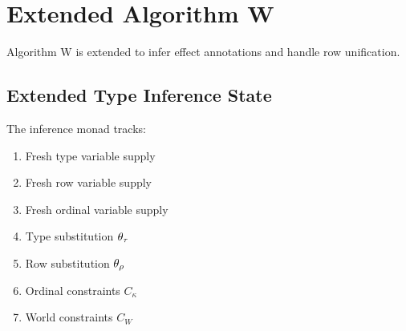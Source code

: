 \section{Extended Algorithm W}
\label{sec:extended-algorithm-w}

Algorithm W is extended to infer effect annotations and handle row unification.

\subsection{Extended Type Inference State}
\label{subsec:extended-infer-state}

\begin{definition}
\label{def:extended-infer-monad}
The inference monad tracks:
\begin{enumerate}
  \item Fresh type variable supply
  \item Fresh row variable supply
  \item Fresh ordinal variable supply
  \item Type substitution $\theta_\tau$
  \item Row substitution $\theta_\rho$
  \item Ordinal constraints $C_\kappa$
  \item World constraints $C_W$
\end{enumerate}
\end{definition}

